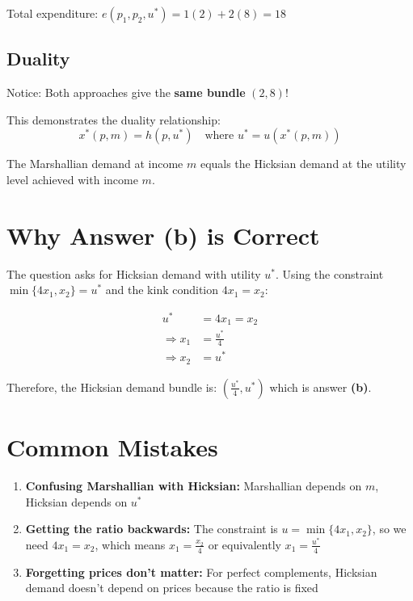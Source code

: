 \documentclass[11pt]{article}
\begin{document}
Total expenditure: $e(p_1, p_2, u^*) = 1(2) + 2(8) = 18$

\subsection{Duality}

Notice: Both approaches give the \textbf{same bundle} $(2, 8)$!

This demonstrates the duality relationship:
\[
x^*(p, m) = h(p, u^*) \quad \text{where } u^* = u(x^*(p, m))
\]

The Marshallian demand at income $m$ equals the Hicksian demand at the utility level achieved with income $m$.

\section{Why Answer (b) is Correct}

The question asks for Hicksian demand with utility $u^*$. Using the constraint $\min\{4x_1, x_2\} = u^*$ and the kink condition $4x_1 = x_2$:

\begin{align*}
u^* &= 4x_1 = x_2 \\
\Rightarrow x_1 &= \frac{u^*}{4} \\
\Rightarrow x_2 &= u^*
\end{align*}

Therefore, the Hicksian demand bundle is: $\boxed{\left(\frac{u^*}{4}, u^*\right)}$ which is answer \textbf{(b)}.

\section{Common Mistakes}

\begin{enumerate}
    \item \textbf{Confusing Marshallian with Hicksian:} Marshallian depends on $m$, Hicksian depends on $u^*$

    \item \textbf{Getting the ratio backwards:} The constraint is $u = \min\{4x_1, x_2\}$, so we need $4x_1 = x_2$, which means $x_1 = \frac{x_2}{4}$ or equivalently $x_1 = \frac{u^*}{4}$

    \item \textbf{Forgetting prices don't matter:} For perfect complements, Hicksian demand doesn't depend on prices because the ratio is fixed
\end{enumerate}
\end{document}
